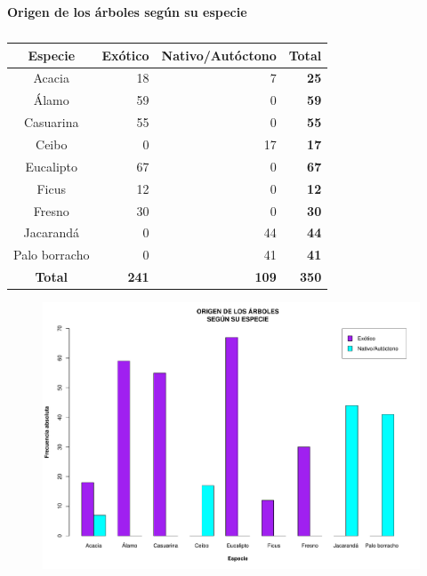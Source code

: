 \documentclass[11pt]{article}
\begin{document}
\begin{table}[h!]
  \begin{center}
    \caption*{\textbf{Origen de los árboles según su especie}}
    \begin{tabular}{| c | r | r | r |}
      \hline
      \textbf{Especie} & \textbf{Exótico} & \textbf{Nativo/Autóctono} &
      \textbf{Total} \\ \hline
      Acacia & 18 & 7 & \textbf{25} \\ \hline
      Álamo & 59 & 0 & \textbf{59} \\ \hline
      Casuarina & 55 & 0 & \textbf{55} \\ \hline
      Ceibo & 0 & 17 & \textbf{17} \\ \hline
      Eucalipto & 67 & 0 & \textbf{67} \\ \hline
      Ficus & 12 & 0 & \textbf{12} \\ \hline
      Fresno & 30 & 0 & \textbf{30} \\ \hline
      Jacarandá & 0 & 44 & \textbf{44} \\ \hline
      Palo borracho & 0 & 41 & \textbf{41} \\ \hline
      \textbf{Total} & \textbf{241} & \textbf{109} & \textbf{350} \\ \hline
    \end{tabular}
    \caption{}
    \label{tab:tablaOrigenEspecie}
  \end{center}
\end{table}

\begin{figure}[h!]
  \begin{center}
    \includegraphics[width=0.9\linewidth]{barrasOrigenEspecie.pdf}
    \caption{}
    \label{fig:barrasOrigenEspecie}
  \end{center}
\end{figure}
\end{document}
